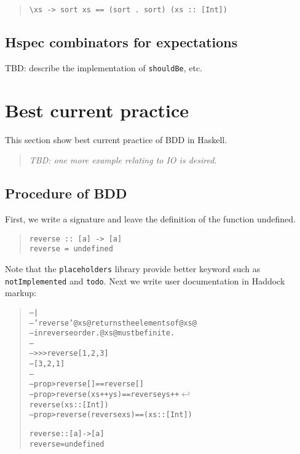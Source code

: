 \documentclass[preprint]{sigplanconf}
\begin{document}
\begin{quote}\small\begin{verbatim}
\xs -> sort xs == (sort . sort) (xs :: [Int])
\end{verbatim}\end{quote}


\subsection{Hspec combinators for expectations}
\label{sec:hspec-comb}

TBD: describe the implementation of {\tt shouldBe}, etc.


\section{Best current practice}
\label{ref:Best-current-practice}

This section show best current practice of
BDD in Haskell.

\begin{quote}
    \emph{TBD: one more example relating to IO is desired.}
\end{quote}

\subsection{Procedure of BDD}

First, we write a signature and leave the definition of the function undefined.

\begin{quote}
\small
\begin{verbatim}
reverse :: [a] -> [a]
reverse = undefined
\end{verbatim}
\end{quote}

\noindent Note that the {\tt placeholders} library provide better keyword such as {\tt notImplemented} and {\tt todo}.
Next we write user documentation in Haddock markup:

\begin{quote}
\small
\begin{alltt}
-- |
-- 'reverse' @xs@ returns the elements of @xs@
-- in reverse order. @xs@ must be finite.
--
-- >>> reverse [1,2,3]
-- [3,2,1]
--
-- prop> reverse [] == reverse []
-- prop> reverse (xs ++ ys) == reverse ys ++ \(\hookleftarrow\)
                               reverse (xs::[Int])
-- prop> reverse (reverse xs) == (xs::[Int])

reverse :: [a] -> [a]
reverse = undefined
\end{alltt}
\end{quote}
\end{document}
